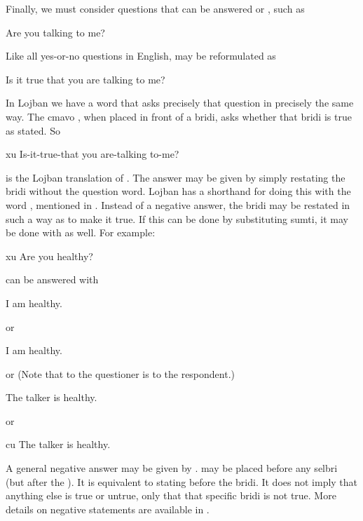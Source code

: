 Finally, we must consider questions that can be answered  or , such as
\begin{example}
Are you talking to me?
\end{example}

Like all yes-or-no questions in English,  may be reformulated as
\begin{example}
Is it true that you are talking
to me?
\end{example}

In Lojban we have a word that asks precisely that question in precisely the same way. The cmavo , when placed in front of a bridi, asks whether that bridi is true as stated. So
\begin{example}
xu   \n
Is-it-true-that you are-talking to-me?
\end{example}

{\noindent}is the Lojban translation of . The answer  may be given by simply restating the bridi without the  question word. Lojban has a shorthand for doing this with the word , mentioned in . Instead of a negative answer, the bridi may be restated in such a way as to make it true. If this can be done by substituting sumti, it may be done with  as well. For example:
\begin{example}
xu  \n
Are you healthy?
\end{example}

{\noindent}can be answered with
\begin{example}
 \n
I am healthy.
\end{example}

{\noindent}or
\begin{example}
\n
I am healthy.
\end{example}

{\noindent}or (Note that  to the questioner is  to the respondent.)
\begin{example}
 \n
The talker is healthy.
\end{example}

{\noindent}or
\begin{example}
 cu \n
The talker is healthy.
\end{example}

A general negative answer may be given by .  may be placed before any selbri (but after the ). It is equivalent to stating  before the bridi. It does not imply that anything else is true or untrue, only that that specific bridi is not true. More details on negative statements are available in .



